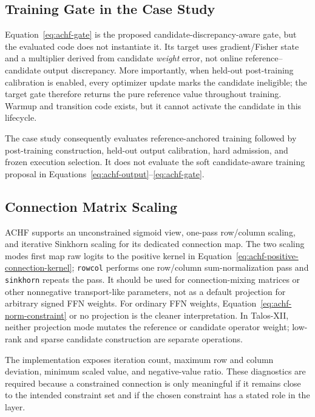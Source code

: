 \documentclass{article}
\newcommand{\achf}{\textsc{ACHF}}
\begin{document}
\subsection{Training Gate in the Case Study}

Equation~\eqref{eq:achf-gate} is the proposed candidate-discrepancy-aware gate,
but the evaluated code does not instantiate it. Its target uses gradient/Fisher
state and a multiplier derived from candidate \emph{weight} error, not online
reference--candidate output discrepancy. More importantly, when held-out
post-training calibration is enabled, every optimizer update marks the
candidate ineligible; the target gate therefore returns the pure reference
value throughout training. Warmup and transition code exists, but it cannot
activate the candidate in this lifecycle.

The case study consequently evaluates reference-anchored training followed by
post-training construction, held-out output calibration, hard admission, and
frozen execution selection. It does not evaluate the soft candidate-aware
training proposal in Equations~\eqref{eq:achf-output}--\eqref{eq:achf-gate}.

\subsection{Connection Matrix Scaling}

\achf{} supports an unconstrained sigmoid view, one-pass row/column scaling,
and iterative Sinkhorn scaling for its dedicated connection map. The two
scaling modes first map raw logits to the positive kernel in
Equation~\eqref{eq:achf-positive-connection-kernel}; \texttt{rowcol} performs
one row/column sum-normalization pass and \texttt{sinkhorn} repeats the pass. It should be used for
connection-mixing matrices or other nonnegative transport-like parameters, not
as a default projection for arbitrary signed FFN weights. For ordinary FFN
weights, Equation~\eqref{eq:achf-norm-constraint} or no projection is the
cleaner interpretation. In Talos-XII, neither projection mode mutates the
reference or candidate operator weight; low-rank and sparse candidate
construction are separate operations.

The implementation exposes iteration count, maximum row and column deviation,
minimum scaled value, and negative-value ratio. These diagnostics are required because a constrained connection is only
meaningful if it remains close to the intended constraint set and if the chosen
constraint has a stated role in the layer.
\end{document}
